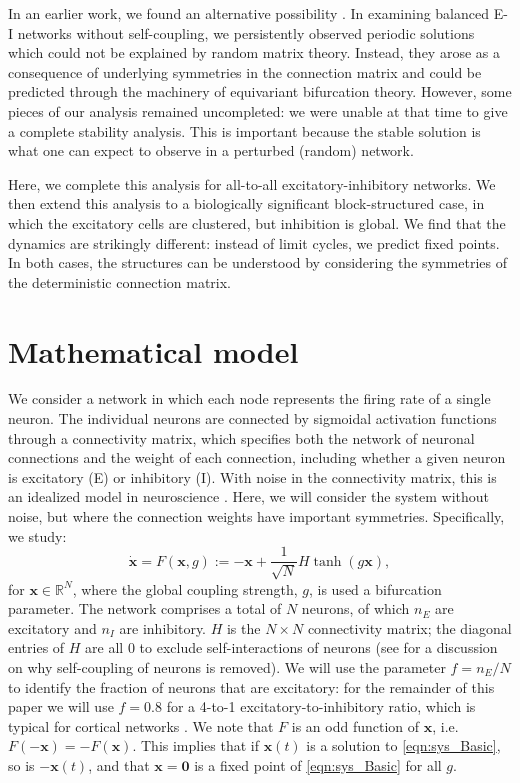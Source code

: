 \documentclass[reqno]{siamonline190516}
\newcommand{\xvec}{\mathbf{x}}
\newcommand{\Zerovec}{\mathbf{0}}
\newcommand{\R}{\mathbb{R}}
\begin{document}
    In an earlier work, we found an alternative possibility \cite{Barreiro2017}.  In examining balanced E-I networks without self-coupling, we persistently observed periodic solutions which could not be explained by random matrix theory. Instead, they arose as a consequence of underlying symmetries in the connection matrix and could be predicted through the machinery of equivariant bifurcation theory. However, some pieces of our analysis remained uncompleted: we were unable at that time to give a complete stability analysis. This is important because the stable solution is what one can expect to observe in a perturbed (random) network.
    
    Here, we complete this analysis for all-to-all excitatory-inhibitory networks. We then extend this analysis to a biologically significant block-structured case, in which the excitatory cells are clustered, but inhibition is global. We find that the dynamics are strikingly different: instead of limit cycles, we predict fixed points. In both cases, the structures can be understood by considering the symmetries of the deterministic connection matrix.
    

\section{Mathematical model}\label{sec:model}

We consider a network in which each node represents the firing rate of a single neuron. The individual neurons are connected by sigmoidal activation functions through a connectivity matrix, which specifies both the network of neuronal connections and the weight of each connection, including whether a given neuron is excitatory (E) or inhibitory (I). With noise in the connectivity matrix, this is an idealized model in neuroscience \cite{Ginzburg_HS_1994,RA06,kadmon_HS_2015}. Here, we will consider the system without noise, but where the connection weights have important symmetries. Specifically, we study:
\begin{equation}\label{eqn:sys_Basic}
    \dot{\xvec} = 
    F(\xvec, g) := -\xvec  + \frac{1}{\sqrt{N}} H\tanh (g \xvec),
\end{equation}
for $\xvec \in \R^N$, where the global coupling strength, $g$, is used a bifurcation parameter. The network comprises a total of $N$ neurons, of which $n_E$ are excitatory and $n_I$ are inhibitory. $H$ is the $N \times N$ connectivity matrix; the diagonal entries of $H$ are all 0 to exclude self-interactions of neurons (see \cite[Sec. 2.1]{Barreiro2017} for a discussion on why self-coupling of neurons is removed). We will use the parameter $f = n_E / N$ to identify the fraction of neurons that are excitatory:  for the remainder of this paper we will use $f = 0.8$ for a 4-to-1 excitatory-to-inhibitory ratio, which is typical for cortical networks \cite{Buxh_Brain_2002}. We note that $F$ is an odd function of $\xvec$, i.e. $F(-\xvec) = -F(\xvec)$. This implies that if $\xvec(t)$ is a solution to \cref{eqn:sys_Basic}, so is $-\xvec(t)$, and that $\xvec = \Zerovec$ is a fixed point of \cref{eqn:sys_Basic} for all $g$.
\end{document}
